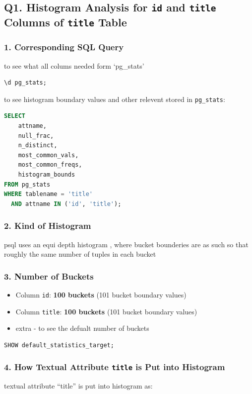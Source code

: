 \documentclass[11pt,a4paper]{article}
\begin{document}
\subsection{Q1. Histogram Analysis for \texttt{id} and \texttt{title} Columns of \texttt{title} Table}

\subsubsection{1. Corresponding SQL Query}
to see what all colums needed form `pg\_stats'

\begin{lstlisting}[language=sql]
\d pg_stats;
\end{lstlisting}

to see histogram boundary values and other relevent  stored in \texttt{pg\_stats}:

\begin{lstlisting}[language=sql]
SELECT 
    attname, 
    null_frac, 
    n_distinct, 
    most_common_vals, 
    most_common_freqs, 
    histogram_bounds 
FROM pg_stats
WHERE tablename = 'title' 
  AND attname IN ('id', 'title');
\end{lstlisting}


\subsubsection{2. Kind of Histogram}
psql uses an equi depth histogram , where bucket bounderies are as such so that roughly the same number of tuples in each bucket


\subsubsection{3. Number of Buckets}
\begin{itemize}
\item Column \texttt{id}: \textbf{100 buckets} (101 bucket boundary values)
\item Column \texttt{title}: \textbf{100 buckets} (101 bucket boundary values)
\item extra -  to see the defualt number of buckets
\end{itemize}
\begin{lstlisting}[language=sql]
SHOW default_statistics_target;
\end{lstlisting}


\subsubsection{4. How Textual Attribute \texttt{title} is Put into Histogram}
textual attribute “title” is put into histogram as:
\end{document}
